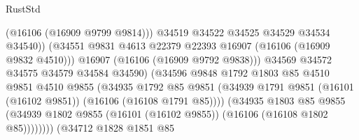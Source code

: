 \begin{lexlean}{RustStd}
\begin{coremodule}
                                              (@16106 (@16909 @9799 @9814)))
                                            @34519
                                            @34522
                                            @34525
                                            @34529
                                            @34534
                                            @34540))
                                        (@34551
                                          @9831
                                          @4613
                                          @22379
                                          @22393
                                          @16907
                                          (@16106 (@16909 @9832 @4510)))
                                        @16907
                                        (@16106 (@16909 @9792 @9838)))
                                      @34569
                                      @34572
                                      @34575
                                      @34579
                                      @34584
                                      @34590)
                                    (@34596
                                      @9848
                                      @1792
                                      @1803
                                      @85
                                      @4510
                                      @9851
                                      @4510
                                      @9855
                                      (@34935
                                        @1792
                                        @85
                                        @9851
                                        (@34939
                                          @1791
                                          @9851
                                          (@16101 (@16102 @9851))
                                          (@16106 (@16108 @1791 @85))))
                                      (@34935
                                        @1803
                                        @85
                                        @9855
                                        (@34939
                                          @1802
                                          @9855
                                          (@16101 (@16102 @9855))
                                          (@16106 (@16108 @1802 @85))))))))
                              (@34712
                                @1828
                                @1851
                                @85

\end{coremodule}
\end{lexlean}
